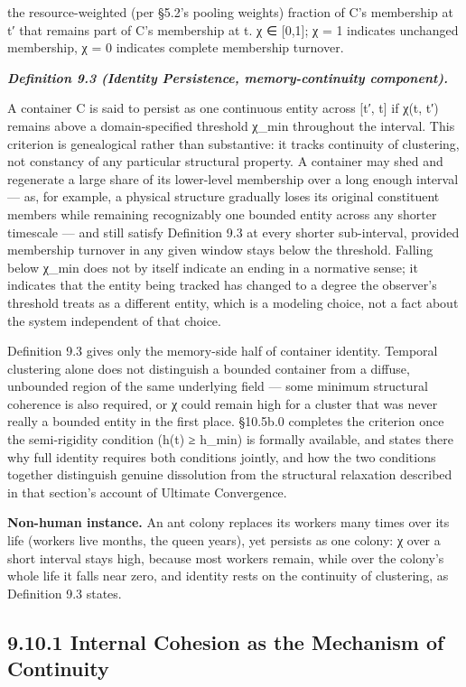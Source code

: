 \documentclass[
]{article}
\begin{document}
the resource-weighted (per §5.2's pooling weights) fraction of C's
membership at t′ that remains part of C's membership at t. χ ∈
{[}0,1{]}; χ = 1 indicates unchanged membership, χ = 0 indicates
complete membership turnover.

\emph{\textbf{Definition 9.3 (Identity Persistence, memory-continuity
component).}}

A container C is said to persist as one continuous entity across {[}t′,
t{]} if χ(t, t′) remains above a domain-specified threshold χ\_min
throughout the interval. This criterion is genealogical rather than
substantive: it tracks continuity of clustering, not constancy of any
particular structural property. A container may shed and regenerate a
large share of its lower-level membership over a long enough interval
--- as, for example, a physical structure gradually loses its original
constituent members while remaining recognizably one bounded entity
across any shorter timescale --- and still satisfy Definition 9.3 at
every shorter sub-interval, provided membership turnover in any given
window stays below the threshold. Falling below χ\_min does not by
itself indicate an ending in a normative sense; it indicates that the
entity being tracked has changed to a degree the observer's threshold
treats as a different entity, which is a modeling choice, not a fact
about the system independent of that choice.

Definition 9.3 gives only the memory-side half of container identity.
Temporal clustering alone does not distinguish a bounded container from
a diffuse, unbounded region of the same underlying field --- some
minimum structural coherence is also required, or χ could remain high
for a cluster that was never really a bounded entity in the first place.
§10.5b.0 completes the criterion once the semi-rigidity condition (h(t)
≥ h\_min) is formally available, and states there why full identity
requires both conditions jointly, and how the two conditions together
distinguish genuine dissolution from the structural relaxation described
in that section's account of Ultimate Convergence.

\textbf{Non-human instance.} An ant colony replaces its workers many
times over its life (workers live months, the queen years), yet persists
as one colony: χ over a short interval stays high, because most workers
remain, while over the colony's whole life it falls near zero, and
identity rests on the continuity of clustering, as Definition 9.3
states.

\hypertarget{internal-cohesion-as-the-mechanism-of-continuity}{%
\subsection{9.10.1 Internal Cohesion as the Mechanism of
Continuity}\label{internal-cohesion-as-the-mechanism-of-continuity}}
\end{document}
